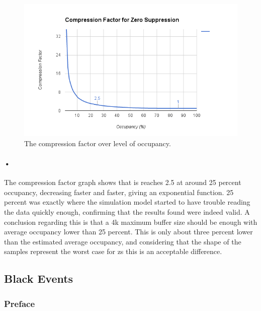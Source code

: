 \documentclass[a4paper, 12pt]{report}
\begin{document}
\begin{figure}[h!]
	\centering
		\includegraphics[width=1.0\textwidth]{images/comp-factor-results.png}
		\caption{The compression factor over level of occupancy.}
		\label{fig:comp-factor-results}
\end{figure}

\paragraph{•}
The compression factor graph shows that is reaches 2.5 at around 25 percent occupancy, decreasing faster and faster, giving an exponential function.
25 percent was exactly where the simulation model started to have trouble reading the data quickly enough, confirming that the results found were indeed valid.
A conclusion regarding this is that a 4k maximum buffer size should be enough with average occupancy lower than 25 percent.
This is only about three percent lower than the estimated average occupancy, and considering that the shape of the samples represent the worst case for \gls{zs} this is an acceptable difference.


\subsection{Black Events}

\subsubsection{Preface}
\end{document}
